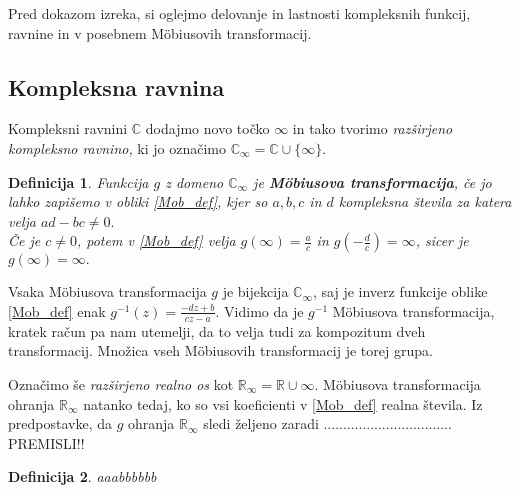 \documentclass[a4paper,12pt]{article}
\def\R{\mathbb{R}} %
\def\C{\mathbb{C}} %
\newtheorem{definicija}{Definicija}
\begin{document}
Pred dokazom izreka, si oglejmo delovanje in lastnosti kompleksnih funkcij, ravnine in v posebnem M\"{o}biusovih transformacij.

\subsection{Kompleksna ravnina}
Kompleksni ravnini $\C$ dodajmo novo točko $\infty$ in tako tvorimo \emph{razširjeno kompleksno ravnino,} ki jo označimo $\C_{\infty} = \C \cup \{\infty\}$.
\begin{definicija}
Funkcija $g$ z domeno $\C_{\infty}$ je \textbf{M\"{o}biusova transformacija}, če jo lahko zapišemo v obliki \eqref{Mob_def}, kjer so $a, b, c$ in $d$ kompleksna števila za katera velja $ad - bc \neq 0.$ \\
Če je $c \neq 0$, potem v \eqref{Mob_def} velja $g(\infty) = \frac{a}{c}$ in $g(-\frac{d}{c}) = \infty$, sicer je $g(\infty) = \infty.$
\end{definicija}

Vsaka M\"{o}biusova transformacija $g$ je bijekcija $\C_{\infty}$, saj je inverz funkcije oblike \eqref{Mob_def} enak $g^{-1}(z) = \frac{-dz + b}{cz - a}$. Vidimo da je $g^{-1}$ M\"{o}biusova transformacija, kratek račun pa nam utemelji, da to velja tudi za kompozitum dveh transformacij. Množica vseh M\"{o}biusovih transformacij je torej grupa.  

Označimo še \emph{razširjeno realno os} kot $\R_{\infty} = \R \cup \infty$. M\"{o}biusova transformacija ohranja $\R_\infty$ natanko tedaj, ko so vsi koeficienti v \eqref{Mob_def} realna števila. Iz predpostavke, da $g$ ohranja $\R_\infty$ sledi željeno zaradi ................................. PREMISLI!!

























\begin{definicija}
aaabbbbbb
\end{definicija}
\end{document}
